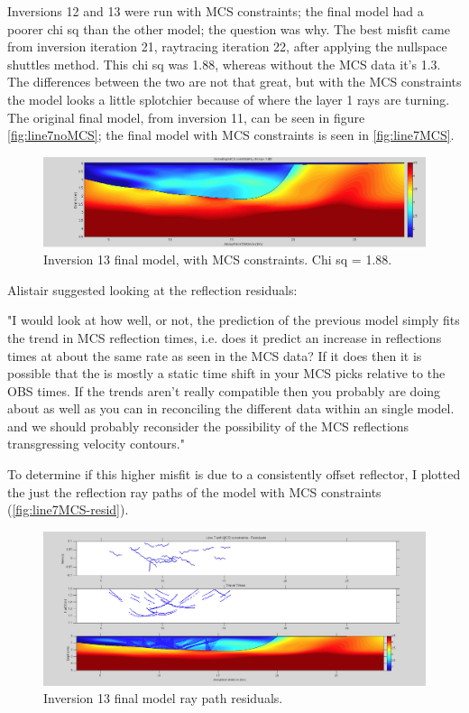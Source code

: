 \documentclass[fontsize=11pt, %
                             paper=a4, %
                             twoside, %
                             captions=tableheading,
                             index=totoc,
                             hyperref]{labbook}
\begin{document}
\begin{addmargin}[4cm]{0cm}
Inversions 12 and 13 were run with MCS constraints; the final model had a poorer chi sq than the other model; the question was why.  The best misfit came from inversion iteration 21, raytracing iteration 22, after applying the nullspace shuttles method.  This chi sq was 1.88, whereas without the MCS data it's 1.3.  The differences between the two are not that great, but with the MCS constraints the model looks a little splotchier because of where the layer 1 rays are turning.  The original final model, from inversion 11, can be seen in figure \autoref{fig:line7noMCS}; the final model with MCS constraints is seen in \autoref{fig:line7MCS}.  


\begin{figure}[h!]
\raggedleft
\includegraphics[scale=0.3,keepaspectratio=true]{figs/Line7_withMCS.png}
\caption{Inversion 13 final model, with MCS constraints.  Chi sq = 1.88.}
\label{fig:line7MCS}
\end{figure}

Alistair suggested looking at the reflection residuals:  

"I would look at how well, or not, the prediction of the previous model simply fits the trend in MCS reflection times, i.e. does it predict an increase in reflections times at about the same rate as seen in the MCS data?  If it does then it is possible that the is mostly a static time shift in your MCS picks relative to the OBS times.  If the trends aren't really compatible then you probably are doing about as well as you can in reconciling the different data within an single model.  and we should probably reconsider the possibility of the MCS reflections transgressing velocity contours."

To determine if this higher misfit is due to a consistently offset reflector, I plotted the just the reflection ray paths of the model with MCS constraints (\autoref{fig:line7MCS-resid}).   

\begin{figure}[h!]
\raggedleft
\includegraphics[scale=0.29,keepaspectratio=true]{figs/line7_resid_MCSconstraints.png}
\caption{Inversion 13 final model ray path residuals.}
\label{fig:line7MCS-resid}
\end{figure}



\end{addmargin}
\end{document}
